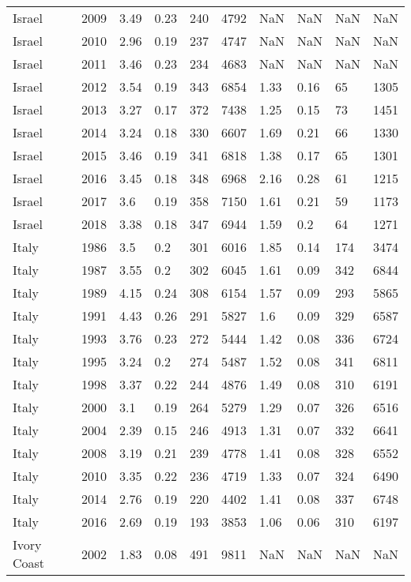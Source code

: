 \begin{tabular}{llllllllll}
Israel & 2009 & 3.49 & 0.23 & 240 & 4792 & NaN & NaN & NaN & NaN \\ 
Israel & 2010 & 2.96 & 0.19 & 237 & 4747 & NaN & NaN & NaN & NaN \\ 
Israel & 2011 & 3.46 & 0.23 & 234 & 4683 & NaN & NaN & NaN & NaN \\ 
Israel & 2012 & 3.54 & 0.19 & 343 & 6854 & 1.33 & 0.16 & 65 & 1305 \\ 
Israel & 2013 & 3.27 & 0.17 & 372 & 7438 & 1.25 & 0.15 & 73 & 1451 \\ 
Israel & 2014 & 3.24 & 0.18 & 330 & 6607 & 1.69 & 0.21 & 66 & 1330 \\ 
Israel & 2015 & 3.46 & 0.19 & 341 & 6818 & 1.38 & 0.17 & 65 & 1301 \\ 
Israel & 2016 & 3.45 & 0.18 & 348 & 6968 & 2.16 & 0.28 & 61 & 1215 \\ 
Israel & 2017 & 3.6 & 0.19 & 358 & 7150 & 1.61 & 0.21 & 59 & 1173 \\ 
Israel & 2018 & 3.38 & 0.18 & 347 & 6944 & 1.59 & 0.2 & 64 & 1271 \\ 
Italy & 1986 & 3.5 & 0.2 & 301 & 6016 & 1.85 & 0.14 & 174 & 3474 \\ 
Italy & 1987 & 3.55 & 0.2 & 302 & 6045 & 1.61 & 0.09 & 342 & 6844 \\ 
Italy & 1989 & 4.15 & 0.24 & 308 & 6154 & 1.57 & 0.09 & 293 & 5865 \\ 
Italy & 1991 & 4.43 & 0.26 & 291 & 5827 & 1.6 & 0.09 & 329 & 6587 \\ 
Italy & 1993 & 3.76 & 0.23 & 272 & 5444 & 1.42 & 0.08 & 336 & 6724 \\ 
Italy & 1995 & 3.24 & 0.2 & 274 & 5487 & 1.52 & 0.08 & 341 & 6811 \\ 
Italy & 1998 & 3.37 & 0.22 & 244 & 4876 & 1.49 & 0.08 & 310 & 6191 \\ 
Italy & 2000 & 3.1 & 0.19 & 264 & 5279 & 1.29 & 0.07 & 326 & 6516 \\ 
Italy & 2004 & 2.39 & 0.15 & 246 & 4913 & 1.31 & 0.07 & 332 & 6641 \\ 
Italy & 2008 & 3.19 & 0.21 & 239 & 4778 & 1.41 & 0.08 & 328 & 6552 \\ 
Italy & 2010 & 3.35 & 0.22 & 236 & 4719 & 1.33 & 0.07 & 324 & 6490 \\ 
Italy & 2014 & 2.76 & 0.19 & 220 & 4402 & 1.41 & 0.08 & 337 & 6748 \\ 
Italy & 2016 & 2.69 & 0.19 & 193 & 3853 & 1.06 & 0.06 & 310 & 6197 \\ 
Ivory Coast & 2002 & 1.83 & 0.08 & 491 & 9811 & NaN & NaN & NaN & NaN \\ 

\end{tabular}
